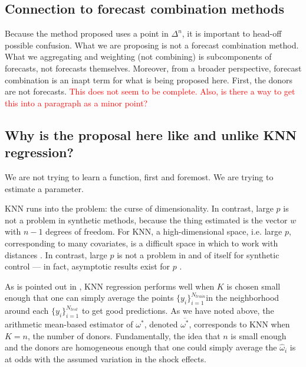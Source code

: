 \documentclass[11pt]{article}
\theoremstyle{definition}
\begin{document}
\subsection{Connection to forecast combination methods}
Because the method proposed uses a point in $\Delta^{n}$, it is important to head-off possible confusion.  What we are proposing is not a forecast combination method.  What we aggregating and weighting (not combining) is subcomponents of forecasts, not forecasts themselves.  Moreover, from a broader perspective, forecast combination is an inapt term for what is being proposed here.  First, the donors are not forecasts. \textcolor{red}{This does not seem to be complete. Also, is there a way to get this into a paragraph as a minor point?}

\subsection{Why is the proposal here like and unlike KNN regression?}
We are not trying to learn a function, first and foremost.  We are trying to estimate a parameter.

KNN runs into the problem: the curse of dimensionality.  In contrast, large $p$ is not a problem in synthetic methods, because the thing estimated is the vector $w$ with $n-1$ degrees of freedom.  For KNN, a high-dimensional space, i.e. large $p$, corresponding to many covariates, is a difficult space in which to work with distances \citep{hastie2009elements}.  In contrast, large $p$ is not a problem in and of itself for synthetic control --- in fact, asymptotic results exist for $p$ \citep{abadie2010synthetic}.  

As is pointed out in \citet{hastie2009elements}, KNN regression performs well when $K$ is chosen small enough that one can simply average the points $\{y_{i}\}_{i=1}^{N_{train}}$in the neighborhood around each $\{y_{i}\}_{i=1}^{N_{test}}$ to get good predictions.  As we have noted above, the arithmetic mean-based estimator of $\omega^{*}$, denoted $\overline{\omega^{*}}$, corresponds to KNN when $K = n$, the number of donors.  Fundamentally, the idea that $n$ is small enough and the donors are homogeneous enough that one could simply average the $\hat\omega_{i}$ is at odds with the assumed variation in the shock effects.
\end{document}
